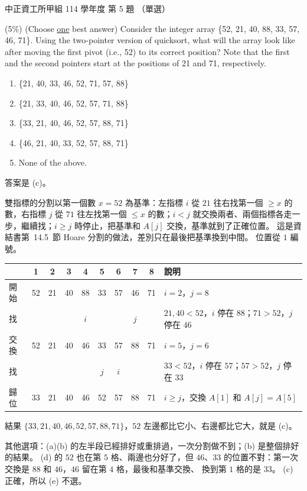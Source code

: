 \begin{pastexam}[label={px:ccu-114-swa-05}]{中正資工所甲組 114 學年度 第 5 題}
（單選）

(5\%) (Choose \underline{one} best answer) Consider the integer array \{52, 21, 40, 88, 33, 57, 46, 71\}.
Using the two-pointer version of quicksort, what will the array look like after moving the first pivot
(i.e., 52) to its correct position? Note that the first and the second pointers start at the positions of
21 and 71, respectively.
\begin{enumerate}[label=(\alph*)]
\item \{21, 40, 33, 46, 52, 71, 57, 88\}
\item \{21, 33, 40, 46, 52, 57, 71, 88\}
\item \{33, 21, 40, 46, 52, 57, 88, 71\}
\item \{46, 21, 40, 33, 52, 57, 88, 71\}
\item None of the above.
\end{enumerate}
\end{pastexam}

\begin{pastsoln}
答案是 (c)。

雙指標的分割以第一個數 $x = 52$ 為基準：左指標 $i$ 從 $21$ 往右找第一個 $\ge x$ 的數，右指標 $j$ 從 $71$
往左找第一個 $\le x$ 的數；$i < j$ 就交換兩者、兩個指標各走一步，繼續找；$i \ge j$ 時停止，把基準和
$A[j]$ 交換，基準就到了正確位置。 這是資結書第~14.5~節 Hoare 分割的做法，差別只在最後把基準換到中間。 位置從 $1$ 編號。

\begin{center}
\small
\begin{tabular}{l*{8}{c}l}
\toprule
& 1 & 2 & 3 & 4 & 5 & 6 & 7 & 8 & 說明 \\
\midrule
開始 & 52 & 21 & 40 & 88 & 33 & 57 & 46 & 71 & $i = 2$，$j = 8$ \\
找 & & & & $i$ & & & $j$ & & $21, 40 < 52$，$i$ 停在 $88$；$71 > 52$，$j$ 停在 $46$ \\
交換 & 52 & 21 & 40 & 46 & 33 & 57 & 88 & 71 & $i = 5$，$j = 6$ \\
找 & & & & & $j$ & $i$ & & & $33 < 52$，$i$ 停在 $57$；$57 > 52$，$j$ 停在 $33$ \\
歸位 & 33 & 21 & 40 & 46 & 52 & 57 & 88 & 71 & $i \ge j$，交換 $A[1]$ 和 $A[j] = A[5]$ \\
\bottomrule
\end{tabular}
\end{center}
結果 $\{33, 21, 40, 46, 52, 57, 88, 71\}$，$52$ 左邊都比它小、右邊都比它大，就是 (c)。

其他選項：(a)(b) 的左半段已經排好或重排過，一次分割做不到；(b) 是整個排好的結果。 (d) 的 $52$ 也在第 $5$
格、兩邊也分好了，但 $46$、$33$ 的位置不對：第一次交換是 $88$ 和 $46$，$46$ 留在第 $4$ 格，最後和基準交換、
換到第 $1$ 格的是 $33$。 (c) 正確，所以 (e) 不選。
\end{pastsoln}

